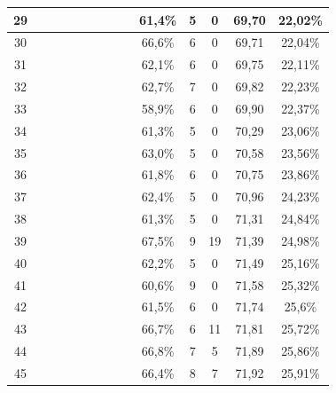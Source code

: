 \begin{longtable}{|c|c|c|c|c|c|c|c|c|c|c|c|c|c|}
29  &  \x    & \x    & \x    & \x    &       & \x    & \x    &       & 61,4\% &  5  & 0  & 69,70 & 22,02\% \\ \hline
30  &  \x    & \x    & \x    & \x    & \x\m  &       &       & \x    & 66,6\% &  6  & 0  & 69,71 & 22,04\% \\ \hline
31  &  \x    & \x    & \x    &       & \x    &       &       & \x    & 62,1\% &  6  & 0  & 69,75 & 22,11\% \\ \hline
32  &  \x    & \x    & \x    & \x    & \x    &       & \x    &       & 62,7\% &  7  & 0  & 69,82 & 22,23\% \\ \hline
33  &  \x    & \x    & \x    &       &       &       &       &       & 58,9\% &  6  & 0  & 69,90 & 22,37\% \\ \hline
34  &  \x    & \x    & \x    & \x    &       & \x\m  & \x    &       & 61,3\% &  5  & 0  & 70,29 & 23,06\% \\ \hline
35  &  \x    & \x    & \x    &       & \x    & \x    & \x    &       & 63,0\% &  5  & 0  & 70,58 & 23,56\% \\ \hline
36  &  \x    & \x    & \x    & \x    & \x    & \x    &       & \x    & 61,8\% &  6  & 0  & 70,75 & 23,86\% \\ \hline
37  &  \x    & \x    & \x    &       & \x    & \x    &       & \x\m  & 62,4\% &  5  & 0  & 70,96 & 24,23\% \\ \hline
38  &  \x    & \x    & \x    & \x    &       &       &       &       & 61,3\% &  5  & 0  & 71,31 & 24,84\% \\ \hline
39  &  \x    & \x    &       & \x    & \x\m  & \x\m  &       &       & 67,5\% &  9  & 19 & 71,39 & 24,98\% \\ \hline
40  &  \x    & \x    & \x    &       & \x    & \x    &       &       & 62,2\% &  5  & 0  & 71,49 & 25,16\% \\ \hline
41  &  \x    & \x    & \x    & \x    &       &       &       &       & 60,6\% &  9  & 0  & 71,58 & 25,32\% \\ \hline
42  &  \x    & \x    & \x    & \x    &       & \x    &       & \x\m  & 61,5\% &  6  & 0  & 71,74 & 25,6\% \\ \hline
43  &  \x    & \x    & \x    &       & \x\m  &       & \x\m  &       & 66,7\% &  6  & 11 & 71,81 & 25,72\% \\ \hline
44  &  \x    & \x    & \x    &       & \x\m  & \x\m  &       & \x\m  & 66,8\% &  7  & 5  & 71,89 & 25,86\% \\ \hline
45  &  \x    & \x    & \x    & \x    & \x\m  & \x    &       & \x    & 66,4\% &  8  & 7  & 71,92 & 25,91\% \\ \hline

\end{longtable}
